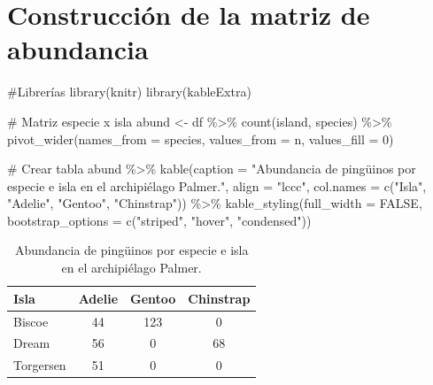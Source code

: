 \documentclass[
  spanish,
  11pt,
  a4paper,
  DIV=11,
  numbers=noendperiod]{scrartcl}
\newenvironment{Shaded}{\begin{snugshade}}{\end{snugshade}}
\newcommand{\AttributeTok}[1]{\textcolor[rgb]{0.40,0.45,0.13}{#1}}
\newcommand{\CommentTok}[1]{\textcolor[rgb]{0.37,0.37,0.37}{#1}}
\newcommand{\ConstantTok}[1]{\textcolor[rgb]{0.56,0.35,0.01}{#1}}
\newcommand{\DecValTok}[1]{\textcolor[rgb]{0.68,0.00,0.00}{#1}}
\newcommand{\FunctionTok}[1]{\textcolor[rgb]{0.28,0.35,0.67}{#1}}
\newcommand{\NormalTok}[1]{\textcolor[rgb]{0.00,0.23,0.31}{#1}}
\newcommand{\OtherTok}[1]{\textcolor[rgb]{0.00,0.23,0.31}{#1}}
\newcommand{\SpecialCharTok}[1]{\textcolor[rgb]{0.37,0.37,0.37}{#1}}
\newcommand{\StringTok}[1]{\textcolor[rgb]{0.13,0.47,0.30}{#1}}
\begin{document}
\section{Construcción de la matriz de
abundancia}\label{construcciuxf3n-de-la-matriz-de-abundancia}

\begin{Shaded}
\begin{Highlighting}[numbers=left,,]
\CommentTok{\#Librerías}
\FunctionTok{library}\NormalTok{(knitr)}
\FunctionTok{library}\NormalTok{(kableExtra)}
\end{Highlighting}
\end{Shaded}

\begin{Shaded}
\begin{Highlighting}[numbers=left,,]
\CommentTok{\# Matriz especie x isla}
\NormalTok{abund }\OtherTok{\textless{}{-}}\NormalTok{ df }\SpecialCharTok{\%\textgreater{}\%}
  \FunctionTok{count}\NormalTok{(island, species) }\SpecialCharTok{\%\textgreater{}\%}
  \FunctionTok{pivot\_wider}\NormalTok{(}\AttributeTok{names\_from =}\NormalTok{ species, }\AttributeTok{values\_from =}\NormalTok{ n, }\AttributeTok{values\_fill =} \DecValTok{0}\NormalTok{)}

\CommentTok{\# Crear tabla}
\NormalTok{abund }\SpecialCharTok{\%\textgreater{}\%}
  \FunctionTok{kable}\NormalTok{(}\AttributeTok{caption =} \StringTok{"Abundancia de pingüinos por especie e isla }
\StringTok{        en el archipiélago Palmer."}\NormalTok{,}
        \AttributeTok{align =} \StringTok{"lccc"}\NormalTok{,}
        \AttributeTok{col.names =} \FunctionTok{c}\NormalTok{(}\StringTok{"Isla"}\NormalTok{, }\StringTok{"Adelie"}\NormalTok{, }\StringTok{"Gentoo"}\NormalTok{, }\StringTok{"Chinstrap"}\NormalTok{)) }\SpecialCharTok{\%\textgreater{}\%}
  \FunctionTok{kable\_styling}\NormalTok{(}\AttributeTok{full\_width =} \ConstantTok{FALSE}\NormalTok{, }\AttributeTok{bootstrap\_options =} \FunctionTok{c}\NormalTok{(}\StringTok{"striped"}\NormalTok{, }
      \StringTok{"hover"}\NormalTok{, }\StringTok{"condensed"}\NormalTok{))}
\end{Highlighting}
\end{Shaded}

\begin{longtable}[t]{lccc}
\caption{\label{tab:abundancia}Abundancia de pingüinos por especie e isla 
        en el archipiélago Palmer.}\\
\toprule
Isla & Adelie & Gentoo & Chinstrap\\
\midrule
Biscoe & 44 & 123 & 0\\
Dream & 56 & 0 & 68\\
Torgersen & 51 & 0 & 0\\
\bottomrule
\end{longtable}
\end{document}
